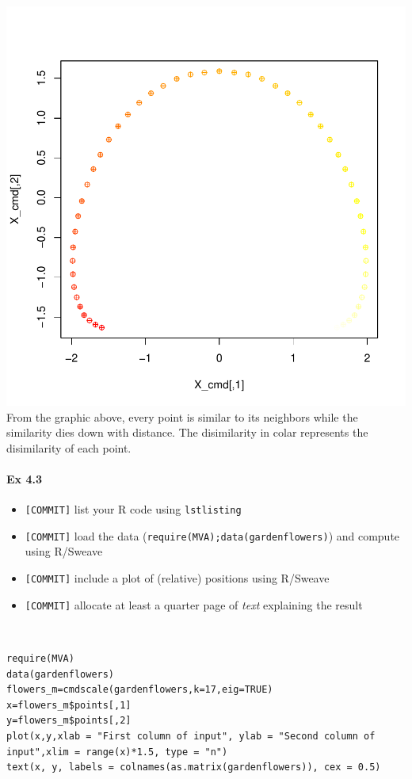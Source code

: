 \documentclass[12pt]{article}
\begin{document}
\includegraphics{jhuang63HW3-016}
\newline
From the graphic above, every point is similar to its neighbors while the similarity dies down with distance. The disimilarity in colar represents the disimilarity of each point.
\\

\paragraph{Ex 4.3}
\begin{itemize}
\item \verb+[COMMIT]+ list your R code using \verb+lstlisting+
\item \verb+[COMMIT]+ load the data
(\verb+require(MVA);data(gardenflowers)+) and compute using R/Sweave
\item \verb+[COMMIT]+ include a plot of (relative) positions using R/Sweave
\item \verb+[COMMIT]+ allocate at least a quarter page of \emph{text} explaining the result
\end{itemize}

\\
\begin{lstlisting}[caption=R codes for Flowers Comparison, label={code:gardenflowers}]
require(MVA)
data(gardenflowers)
flowers_m=cmdscale(gardenflowers,k=17,eig=TRUE)
x=flowers_m$points[,1]
y=flowers_m$points[,2]
plot(x,y,xlab = "First column of input", ylab = "Second column of input",xlim = range(x)*1.5, type = "n")
text(x, y, labels = colnames(as.matrix(gardenflowers)), cex = 0.5)
\end{lstlisting}
\end{document}
